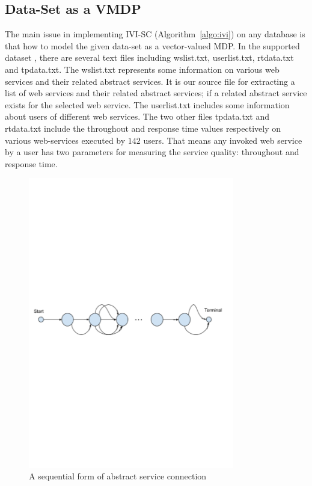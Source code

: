 \documentclass[10pt,journal,compsoc]{IEEEtran}
\begin{document}
\subsection{Data-Set as a VMDP}
The main issue in implementing IVI-SC (Algorithm~\ref{algo:ivi}) on any database is that how to model the given data-set as a vector-valued MDP. In the supported dataset \cite{Zheng2014,Zheng2015}, there are several text files including wslist.txt, userlist.txt, rtdata.txt and tpdata.txt. The wslist.txt represents some information on various web services and their related abstract services. It is our source file for extracting a list of web services and their related abstract services; if a related abstract service exists for the selected web service. The userlist.txt includes some information about users of different web services. The two other files tpdata.txt and rtdata.txt include the throughout and response time values respectively on various web-services executed by $142$ users. That means any invoked web service by a user has two parameters for measuring the service quality: throughout and response time. 

\begin{figure}[t]
\label{fig:seq-mdp}
\centering
\includegraphics[width=9cm]{graphs/seq-mdp-}
\caption{A sequential form of abstract service connection}
\end{figure}
\end{document}
